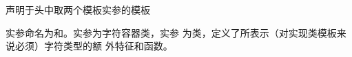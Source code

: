 声明于头中取两个模板实参的模板

\begin{note}[\noindent]
  实参命名为和。实参为字符容器类，实参
  为类，定义了所表示（对实现类模板来说必须）字符类型的额
  外特征和函数。
\end{note}
